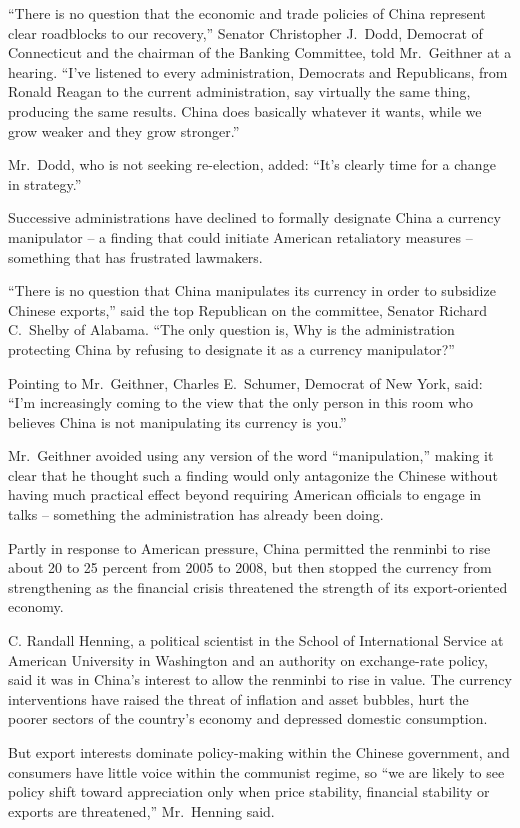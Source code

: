 ﻿\documentclass[12pt]{article}
\begin{document}
``There is no question that the economic and trade policies of China represent clear roadblocks to
our recovery,'' Senator Christopher J.~Dodd, Democrat of Connecticut and the chairman of the Banking
Committee, told Mr.~Geithner at a hearing. ``I've listened to every administration, Democrats and
Republicans, from Ronald Reagan to the current administration, say virtually the same thing,
producing the same results. China does basically whatever it wants, while we grow weaker and they
grow stronger.''

Mr.~Dodd, who is not seeking re-election, added: ``It's clearly time for a change in strategy.''

Successive administrations have declined to formally designate China a currency manipulator -- a
finding that could initiate American retaliatory measures -- something that has frustrated
lawmakers.

``There is no question that China manipulates its currency in order to subsidize Chinese exports,''
said the top Republican on the committee, Senator Richard C.~Shelby of Alabama. ``The only question
is, Why is the administration protecting China by refusing to designate it as a currency
manipulator?''

Pointing to Mr.~Geithner, Charles E.~Schumer, Democrat of New York, said: ``I'm increasingly coming
to the view that the only person in this room who believes China is not manipulating its currency is
you.''

Mr.~Geithner avoided using any version of the word ``manipulation,'' making it clear that he thought
such a finding would only antagonize the Chinese without having much practical effect beyond
requiring American officials to engage in talks -- something the administration has already been
doing.

Partly in response to American pressure, China permitted the renminbi to rise about 20 to 25 percent
from 2005 to 2008, but then stopped the currency from strengthening as the financial crisis
threatened the strength of its export-oriented economy.

C. Randall Henning, a political scientist in the School of International Service at American
University in Washington and an authority on exchange-rate policy, said it was in China's interest
to allow the renminbi to rise in value. The currency interventions have raised the threat of
inflation and asset bubbles, hurt the poorer sectors of the country's economy and depressed domestic
consumption.

But export interests dominate policy-making within the Chinese government, and consumers have little
voice within the communist regime, so ``we are likely to see policy shift toward appreciation only
when price stability, financial stability or exports are threatened,'' Mr.~Henning said.
\end{document}

